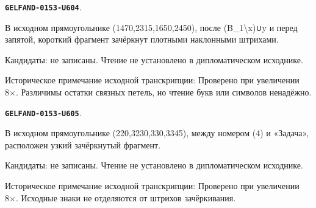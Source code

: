 \documentclass[11pt]{article}
\theoremstyle{definition}
\theoremstyle{remark}
\begin{document}
\par\noindent\leavevmode{}\label{GELFAND-0153-U604}\label{GELFAND-P001411:basis-exchange-cancelled:note}\textbf{\texttt{GELFAND-0153-U604}}.\nopagebreak[4]\par
В исходном прямоугольнике (1470,2315,1650,2450), после (B\_1\textbackslash{}x)∪y и перед запятой, короткий фрагмент зачёркнут плотными наклонными штрихами.\par
Кандидаты: не записаны. Чтение не установлено в дипломатическом исходнике.\par
Историческое примечание исходной транскрипции: Проверено при увеличении 8×. Различимы остатки связных петель, но чтение букв или символов ненадёжно.\par\medskip
\par\noindent\leavevmode{}\label{GELFAND-0153-U605}\label{GELFAND-P001411:problem-four-cancelled:note}\textbf{\texttt{GELFAND-0153-U605}}.\nopagebreak[4]\par
В исходном прямоугольнике (220,3230,330,3345), между номером (4) и «Задача», расположен узкий зачёркнутый фрагмент.\par
Кандидаты: не записаны. Чтение не установлено в дипломатическом исходнике.\par
Историческое примечание исходной транскрипции: Проверено при увеличении 8×. Исходные знаки не отделяются от штрихов зачёркивания.\par\medskip
\end{document}
